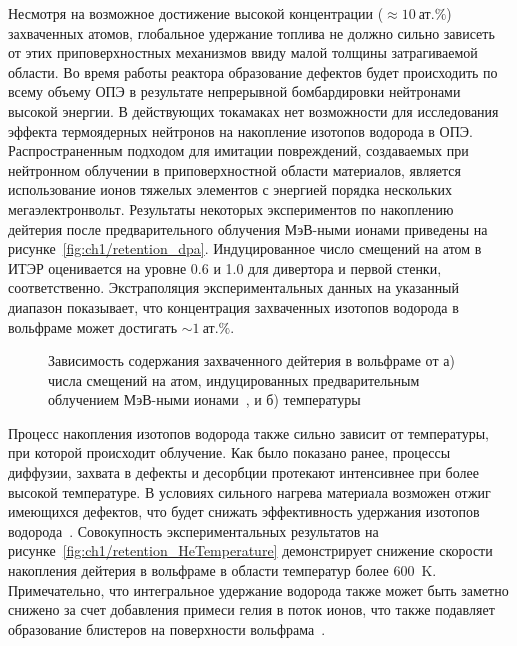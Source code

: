 Несмотря на возможное достижение высокой концентрации (\( \approx \SI{10}{\text{ат.}\percent} \)) захваченных атомов, глобальное удержание топлива не должно сильно зависеть от этих приповерхностных механизмов ввиду малой толщины затрагиваемой области. Во время работы реактора образование дефектов будет происходить по всему объему ОПЭ в результате непрерывной бомбардировки нейтронами высокой энергии. В действующих токамаках нет возможности для исследования эффекта термоядерных нейтронов на накопление изотопов водорода в ОПЭ. Распространенным подходом для имитации повреждений, создаваемых при нейтронном облучении в приповерхностной области материалов, является использование ионов тяжелых элементов с энергией порядка нескольких мегаэлектронвольт. Результаты некоторых экспериментов по накоплению дейтерия после предварительного облучения МэВ-ными ионами приведены на рисунке~\cref{fig:ch1/retention_dpa}. Индуцированное число смещений на атом в ИТЭР оценивается на уровне \num{0.6} и \num{1.0} для дивертора и первой стенки, соответственно. Экстраполяция экспериментальных данных на указанный диапазон показывает, что концентрация захваченных изотопов водорода в вольфраме может достигать \( \sim \SI{1}{\text{ат.}\percent} \). 

\begin{figure}[ht]
    \caption{Зависимость содержания захваченного дейтерия в вольфраме от а) числа смещений на атом, индуцированных предварительным облучением МэВ-ными ионами~\cite{Roth2011}, и б) температуры~\cite{Rieth2019}}
\end{figure}

Процесс накопления изотопов водорода также сильно зависит от температуры, при которой происходит облучение. Как было показано ранее, процессы диффузии, захвата в дефекты и десорбции протекают интенсивнее при более высокой температуре. В условиях сильного нагрева материала возможен отжиг имеющихся дефектов, что будет снижать эффективность удержания изотопов водорода~\cite{Dark2024}. Совокупность экспериментальных результатов на рисунке~\cref{fig:ch1/retention_HeTemperature} демонстрирует снижение скорости накопления дейтерия в вольфраме в области температур более \SI{600}{\kelvin}. Примечательно, что интегральное удержание водорода также может быть заметно снижено за счет добавления примеси гелия в поток ионов, что также подавляет образование блистеров на поверхности вольфрама~\cite{Baldwin2011}. 

